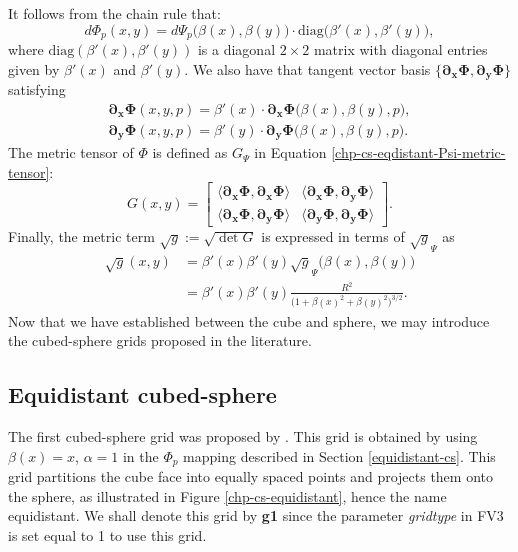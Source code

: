 It follows from the chain rule that:
\begin{equation*}
        d\Phi_p(x,y) = d\Psi_p\big(\beta(x),\beta(y)\big)\cdot\text{diag}\big(\beta'(x),\beta'(y)\big),
\end{equation*}
where $\text{diag}(\beta'(x),\beta'(y))$ is a diagonal $2\times 2$ matrix with diagonal entries given by $\beta'(x)$ and $\beta'(y)$.
We also have that tangent vector basis $\{\boldsymbol{\partial_x \Phi},  \boldsymbol{\partial_y \Phi}\}$ satisfying
\begin{align*}
	\boldsymbol{\partial_x \Phi}(x,y,p) = \beta'(x) \cdot \boldsymbol{\partial_x \Phi}\big(\beta(x),\beta(y),p\big),\\
	\boldsymbol{\partial_y \Phi}(x,y,p) = \beta'(y) \cdot \boldsymbol{\partial_y \Phi}\big(\beta(x),\beta(y),p\big).
\end{align*}
The metric tensor of $\Phi$ is defined as $G_{\Psi}$ in Equation \eqref{chp-cs-eqdistant-Psi-metric-tensor}:
\begin{equation*}
	\label{chp-cs-eqdistant-Phi-metric-tensor}
	G(x,y) = 
	\begin{bmatrix}
		\langle  \boldsymbol{\partial_x \Phi}, \boldsymbol{\partial_x \Phi} \rangle & 
		\langle  \boldsymbol{\partial_x \Phi}, \boldsymbol{\partial_y \Phi} \rangle \\
		\langle  \boldsymbol{\partial_x \Phi}, \boldsymbol{\partial_y \Phi} \rangle  &
		\langle  \boldsymbol{\partial_y \Phi}, \boldsymbol{\partial_y \Phi} \rangle 
	\end{bmatrix}.
\end{equation*}
Finally, the metric term $\sqrt{g}:= \sqrt{\det{G}}$ is expressed in terms of $\sqrt{g}_{\Psi}$ as
\begin{align*}
    \sqrt{g}(x,y) &= \beta'(x)\beta'(y)\sqrt{g}_{\Psi}\big(\beta(x),\beta(y)\big)\\
    &= \beta'(x)\beta'(y)\frac{R^2}{\big(1+\beta(x)^2+\beta(y)^2\big)^{3/2}}.
\end{align*}
Now that we have established between the cube and sphere, we may introduce the cubed-sphere grids proposed in the literature.

\subsection{Equidistant cubed-sphere}
\label{cs-equidistant}
The first cubed-sphere grid was proposed by \citet{sadourny:1972}. This grid is obtained by using
$\beta(x) = x$, $\alpha=1$ in the $\Phi_p$ mapping described in Section \ref{equidistant-cs}.
This grid partitions the cube face into equally spaced points
and projects them onto the sphere, as illustrated in Figure
\ref{chp-cs-equidistant}, hence the name equidistant.
We shall denote this grid by \textbf{g1} since the parameter
\textit{gridtype} in FV3 is set equal to 1 to use this grid.

